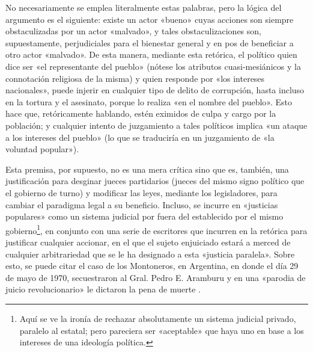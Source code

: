 \documentclass[12pt,a4paper,twoside]{book}
\begin{document}
No necesariamente se emplea literalmente estas palabras, pero la lógica del argumento es el siguiente: existe un actor «bueno» cuyas acciones son siempre obstaculizadas por un actor «malvado», y tales obstaculizaciones son, supuestamente, perjudiciales para el bienestar general y en pos de beneficiar a otro actor «malvado». De esta manera, mediante esta retórica, el político quien dice ser «el representante del pueblo» (nótese los atributos cuasi-mesiánicos y la connotación religiosa de la misma) y quien responde por «los intereses nacionales», puede injerir en cualquier tipo de delito de corrupción, hasta incluso en la tortura y el asesinato, porque lo realiza «en el nombre del pueblo». Esto hace que, retóricamente hablando, estén eximidos de culpa y cargo por la población; y cualquier intento de juzgamiento a tales políticos implica «un ataque a los intereses del pueblo» (lo que se traduciría en un juzgamiento de «la voluntad popular»).

Esta premisa, por supuesto, no es una mera crítica sino que es, también, una justificación para desginar jueces partidarios (jueces del mismo signo político que el gobierno de turno) y modificar las leyes, mediante los legisladores, para cambiar el paradigma legal a su beneficio. Incluso, se incurre en «justicias populares» como un sistema judicial por fuera del establecido por el mismo gobierno\footnote{Aquí se ve la ironía de rechazar absolutamente un sistema judicial privado, paralelo al estatal; pero pareciera ser «aceptable» que haya uno en base a los intereses de una ideología política.}, en conjunto con una serie de escritores que incurren en la retórica para justificar cualquier accionar, en el que el sujeto enjuiciado estará a merced de cualquier arbitrariedad que se le ha designado a esta «justicia paralela». Sobre esto, se puede citar el caso de los Montoneros, en Argentina, en donde el día 29 de mayo de 1970, secuestraron al Gral. Pedro E. Aramburu y en una «parodia de juicio revolucionario» le dictaron la pena de muerte \cite[pág. 78]{jovenesidealistas}.
\end{document}
